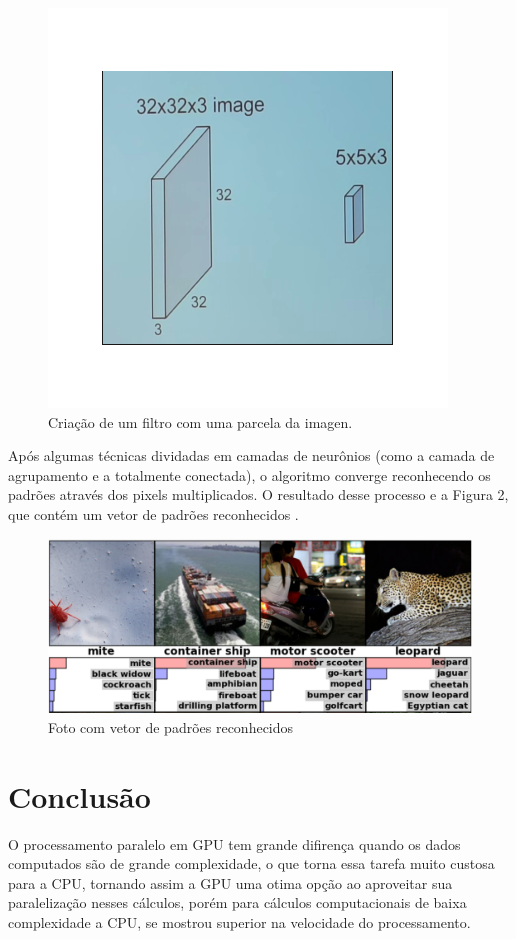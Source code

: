 \documentclass[conference]{IEEEtran}
\begin{document}
	\begin{figure}[H]
		\centering
		\includegraphics[scale=0.2]{imagen/1.png}
		
		\caption{Criação de um filtro com uma parcela da imagen.}
		\label{figRotulo}
	\end{figure}
	Após algumas técnicas dividadas em camadas de neurônios (como a camada de agrupamento e a totalmente conectada), o algoritmo converge reconhecendo os padrões através dos pixels multiplicados.
	O resultado desse processo e a Figura 2, que contém um vetor de padrões reconhecidos \cite{IEEEhowto:3}.

	 \begin{figure}[H]
		\centering
		\includegraphics[scale=0.15]{imagen/AlexClassification.png}
		
		\caption{Foto com vetor de padrões reconhecidos}
		\label{figRotulo}
	\end{figure}
	\section*{Conclus\~ao}
	O processamento paralelo em GPU tem grande difiren\c{c}a quando os dados computados s\~ao de grande complexidade, o que torna essa tarefa muito custosa para a CPU, tornando assim a GPU uma otima opção ao aproveitar sua paralelização  nesses c\'alculos, por\'em para c\'alculos computacionais de baixa complexidade a CPU, se mostrou superior na velocidade do processamento.
	
\end{document}
